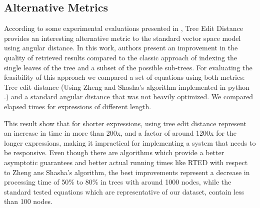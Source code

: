\subsection{Alternative Metrics}
According to some experimental evaluations presented in \cite{tree_comparison}, Tree Edit Distance provides an interesting alternative metric to the standard vector space model using angular distance. In this work, authors present an improvement in the quality of retrieved results compared to the classic approach of indexing the single leaves of the tree and a subset of the possible sub-trees. For evaluating the feasibility of this approach we compared a set of equations using both metrics: Tree edit distance (Using Zheng and Shasha's algorithm implemented in python \cite{tree_distance_python}.) and a standard angular distance that was not heavily optimized. We compared elapsed times for expressions of different length.


This result show that for shorter expressions, using tree edit distance represent an increase in time in more than 200x, and a factor of around 1200x for the longer expressions, making it impractical for implementing a system that needs to be responsive. Even though there are algorithms which provide a better asymptotic guarantees and better actual running times like RTED\cite{rted} with respect to Zheng ans Shasha's algorithm, the best improvements represent a decrease in processing time of 50\% to 80\% in trees with around 1000 nodes, while the standard tested equations which are representative of our dataset, contain less than 100 nodes.
